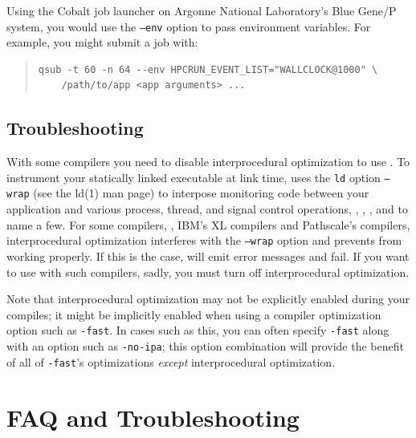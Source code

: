 \documentclass[11pt,letterpaper]{report}
\begin{document}
Using the Cobalt job launcher on Argonne National Laboratory's Blue Gene/P system, you would use the \texttt{--env} option to pass environment variables.
For example, you might submit a job with:
\begin{quote}
\begin{verbatim}
qsub -t 60 -n 64 --env HPCRUN_EVENT_LIST="WALLCLOCK@1000" \
    /path/to/app <app arguments> ...
\end{verbatim}
\end{quote}



\section{Troubleshooting}

With some compilers you need to disable interprocedural optimization to use \hpclink{}.
To instrument your statically linked executable at link time, \hpclink{} uses the \texttt{ld} option \texttt{--wrap} (see the ld(1) man page) to interpose monitoring code between your application and various process, thread, and signal control operations, \eg{}, , , and  to name a few.
For some compilers, \eg{}, IBM's XL compilers and Pathscale's compilers, interprocedural optimization interferes with the \texttt{--wrap} option and prevents \hpclink{} from working properly.
If this is the case, \hpclink{} will emit error messages and fail.
If you want to use \hpclink{} with such compilers, sadly, you must turn off interprocedural optimization.

Note that interprocedural optimization may not be explicitly enabled during your compiles; it might be implicitly enabled when using a compiler optimization option such as \texttt{-fast}.
In cases such as this, you can often specify \texttt{-fast} along with an option such as \texttt{-no-ipa}; this option combination will provide the benefit of all of \texttt{-fast}'s optimizations {\em except} interprocedural optimization.



\chapter{FAQ and Troubleshooting}
\label{chpt:faq-troubleshooting}
\end{document}
